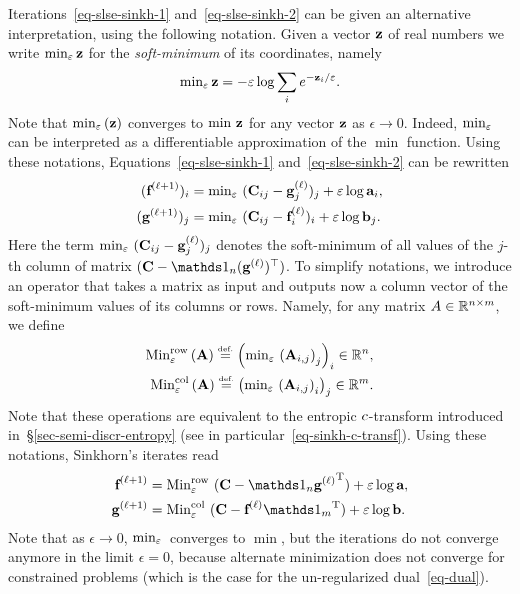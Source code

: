 \begin{rem}
Iterations~\eqref{eq-slse-sinkh-1} and~\eqref{eq-slse-sinkh-2} can be given an alternative interpretation, using the following notation. Given a vector $\mathrm{\textbf{\upshape z}}$ of real numbers we write $\text{min}_\varepsilon\,\mathrm{\textbf{\upshape z}}$ for the \emph{soft-minimum} of its coordinates, namely
$$
\text{min}_\varepsilon\,\mathrm{\textbf{\upshape z}}= -\varepsilon \log \sum_i e^{-\mathrm{\textbf{\upshape z}}_i/\varepsilon}.
$$
Note that $\text{min}_\varepsilon\,(\mathrm{\textbf{\upshape z}})$ converges to $\min\,\mathrm{\textbf{\upshape z}}$ for any vector $\mathrm{\textbf{\upshape z}}$ as $\epsilon\rightarrow 0$. Indeed, $\text{min}_\varepsilon\,$ can be interpreted as a differentiable approximation of the $\min$ function. Using these notations, Equations~\eqref{eq-slse-sinkh-1} and~\eqref{eq-slse-sinkh-2} can be rewritten
\begin{align}
\label{eq-slse-smin-1}(\mathrm{\textbf{\upshape f}}^{(\ell+1)})_i &= \text{min}_\varepsilon\,\, (\mathrm{\textbf{\upshape C}}_{ij}-\mathrm{\textbf{\upshape g}}^{(\ell)}_j)_j + \varepsilon \log \mathrm{\textbf{\upshape a}}_i, \\
\label{eq-slse-smin-2}(\mathrm{\textbf{\upshape g}}^{(\ell+1)})_j &= \text{min}_\varepsilon\,\, (\mathrm{\textbf{\upshape C}}_{ij}-\mathrm{\textbf{\upshape f}}^{(\ell)}_i)_i + \varepsilon \log \mathrm{\textbf{\upshape b}}_j.
\end{align}
Here the term $\text{min}_\varepsilon\,\, (\mathrm{\textbf{\upshape C}}_{ij}-\mathrm{\textbf{\upshape g}}^{(\ell)}_j)_j$ denotes the soft-minimum of all values of the $j$-th column of matrix $(\C-\ones_n (\it{\gD})^\top )$. To simplify notations, we introduce an operator that takes a matrix as input and outputs now a column vector of the soft-minimum values of its columns or rows. Namely, for any matrix $A\in\mathbb{R}^{n\times m}$, we define
\begin{align*}
	\text{Min}^{\text{row}}_\varepsilon\,(\mathrm{\textbf{\upshape A}}) \stackrel{\mbox{\upshape\tiny def.}}{=} \left( \text{min}_\varepsilon\, \left( \mathrm{\textbf{\upshape A}}_{i,j} \right)_j \right)_i\in\mathbb{R}^n,\\ 
	\text{Min}^{\text{col}}_\varepsilon\,(\mathrm{\textbf{\upshape A}}) \stackrel{\mbox{\upshape\tiny def.}}{=} \left( \text{min}_\varepsilon\, \left( \mathrm{\textbf{\upshape A}}_{i,j} \right)_i \right)_j\in\mathbb{R}^m.
\end{align*}
Note that these operations are equivalent to the entropic $c$-transform introduced in~\S\ref{sec-semi-discr-entropy} (see in particular~\eqref{eq-sinkh-c-transf}).
%
Using these notations, Sinkhorn's iterates read
\begin{align}
	\label{eq-lse-dual-1}\itt{\fD} &= \SMINEr\, (\C-\ones_n\transp{\it{\gD}}) + \epsilon \log \a, \\
	\label{eq-lse-dual-2}\itt{\gD} &= \SMINEc\, (\C-\it{\fD}\transp{\ones_m})  + \epsilon \log \b.
\end{align}
Note that as $\epsilon \rightarrow 0$, $\text{min}_\varepsilon\,$ converges to $\min$, but the iterations do not converge anymore in the limit $\epsilon=0$, because alternate minimization does not converge for constrained problems (which is the case for the un-regularized dual~\eqref{eq-dual}).
\end{rem}



